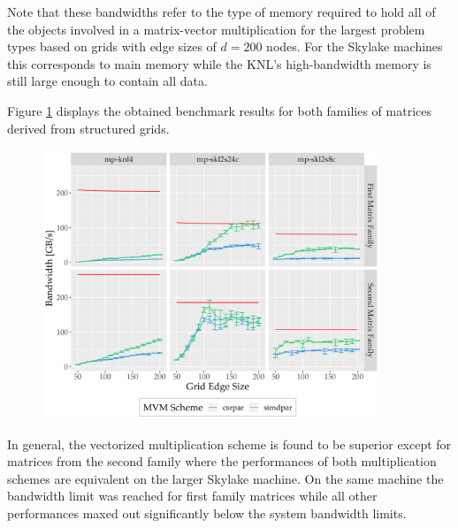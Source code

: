     Note that these bandwidths refer to the type of memory required to hold all of the objects involved in a
    matrix-vector multiplication for the largest problem types based on grids with edge sizes of $d = 200$ nodes. For
    the Skylake machines this corresponds to main memory while the KNL's high-bandwidth memory is still large enough to
    contain all data. 

    Figure \ref{fig:mvm-perturbed-new} displays the obtained benchmark results for both families of matrices derived
    from structured grids.

    \begin{figure}[H]
      \centering
      \captionsetup{width=0.9\textwidth}
      \includegraphics[width=0.9\textwidth]{assets/mvm-perturbed-new}
      \label{fig:mvm-perturbed-new}
    \end{figure}

     In general, the vectorized multiplication scheme is found to be superior except for matrices from the second family
     where the performances of both multiplication schemes are equivalent on the larger Skylake machine. On the same
     machine the bandwidth limit was reached for first family matrices while all other performances maxed out
     significantly below the system bandwidth limits.
 
